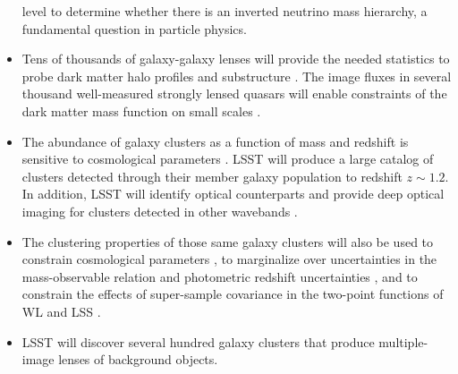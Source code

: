 \begin{itemize}
level to determine whether there is an inverted neutrino mass hierarchy, a
fundamental question in particle physics.
\item Tens of thousands of galaxy-galaxy lenses will provide the needed statistics to probe dark matter
halo profiles and substructure \cite[e.g.,][]{2006MNRAS.368..715M,2012Natur.481..341V}. The image fluxes in several thousand well-measured
strongly lensed quasars will enable constraints of the dark matter mass function on small scales \citep{2002ApJ...572...25D}.
\item The abundance of galaxy clusters as a function of mass and redshift is sensitive to cosmological parameters
\citep[SciBook, Ch.~13;][]{2014MNRAS.443.1973V}. LSST will produce a large catalog of clusters detected through their member galaxy population
to redshift $z\sim 1.2$.  In addition, LSST will identify optical counterparts and provide deep optical
imaging for clusters detected in other wavebands \citep[e.g.,][]{2009ApJ...701...32S}.
\item The clustering properties of those same galaxy clusters will also be used to constrain
  cosmological parameters \citep{1996MNRAS.282.1096M,2013MNRAS.434..684M}, to marginalize over uncertainties in
  the mass-observable relation and photometric redshift uncertainties \citep{2011PhRvD..83b3008O}, and to constrain the effects of super-sample covariance in the two-point functions of WL and LSS \citep{2003ApJ...584..702H,2014MNRAS.441.2456T}.
\item LSST will discover several hundred galaxy clusters that produce multiple-image lenses of background objects.

\end{itemize}

